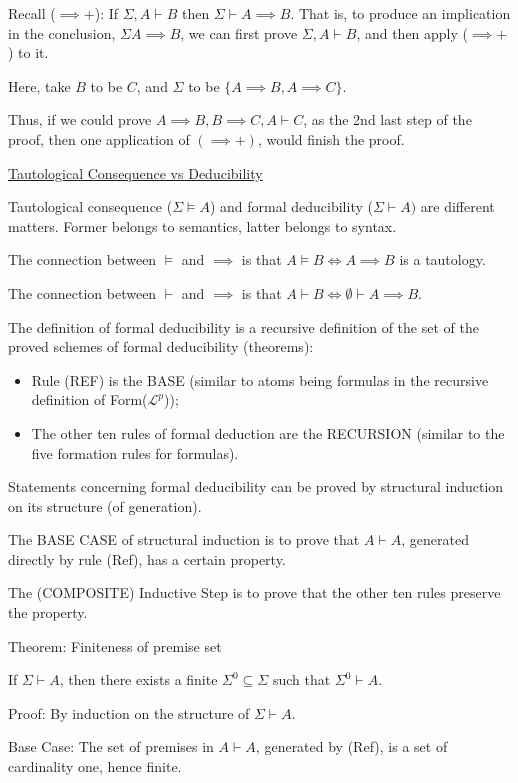 \documentclass{article}
\begin{document}
Recall ($\implies +$): If $\Sigma, A \vdash B$ then $\Sigma \vdash A \implies B$. That is, to produce an implication in the conclusion, $\Sigma A \implies B$, we can first prove $\Sigma, A \vdash B$, and then apply ($\implies +$) to it.

Here, take $B$ to be $C$, and $\Sigma$ to be $\{A \implies B, A \implies C\}$.

Thus, if we could prove $A \implies B, B \implies C, A \vdash C$, as the 2nd last step of the proof, then one application of $(\implies +)$, would finish the proof. 

\underline{Tautological Consequence vs Deducibility}

Tautological consequence ($\Sigma \vDash A$) and formal deducibility ($\Sigma \vdash A)$ are different matters. Former belongs to semantics, latter belongs to syntax. 

The connection between $\vDash$ and $\implies$ is that $A \vDash B \iff A \implies B$ is a tautology.

The connection between $\vdash$ and $\implies$ is that $A \vdash B \iff \emptyset \vdash A \implies B$.

The definition of formal deducibility is a recursive definition of the set of the proved schemes of formal deducibility (theorems):
\begin{itemize}
    \item Rule (REF) is the BASE (similar to atoms being formulas in the recursive definition of Form($\mathcal{L}^p$));
    \item The other ten rules of formal deduction are the RECURSION (similar to the five formation rules for formulas). 
\end{itemize}

Statements concerning formal deducibility can be proved by structural induction on its structure (of generation).

The BASE CASE of structural induction is to prove that $A \vdash A$, generated directly by rule (Ref), has a certain property. 

The (COMPOSITE) Inductive Step is to prove that the other ten rules preserve the property. 


Theorem: Finiteness of premise set

If $\Sigma \vdash A$, then there exists a finite $\Sigma^0 \subseteq \Sigma$ such that $\Sigma^0 \vdash A$.

Proof: By induction on the structure of $\Sigma \vdash A$.

Base Case: The set of premises in $A \vdash A$, generated by (Ref), is a set of cardinality one, hence finite. 
\end{document}
